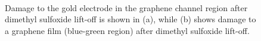\documentclass[
  a4paper,
]{scrbook}
\begin{document}
\begin{figure}
\begin{minipage}[t]{0.01\linewidth}
{\centering 

~

}

\end{minipage}%
%
\begin{minipage}[t]{0.03\linewidth}

{\centering 


}

\end{minipage}%
%
\begin{minipage}[t]{0.01\linewidth}

{\centering 

~

}

\end{minipage}%
%
\begin{minipage}[t]{0.45\linewidth}

{\centering 


}

\end{minipage}%
%
\begin{minipage}[t]{0.01\linewidth}

{\centering 

~

}

\end{minipage}%

\caption{\label{fig-dmso-damage}Damage to the gold electrode in the
graphene channel region after dimethyl sulfoxide lift-off is shown in
(a), while (b) shows damage to a graphene film (blue-green region) after
dimethyl sulfoxide lift-off.}

\end{figure}
\end{document}
